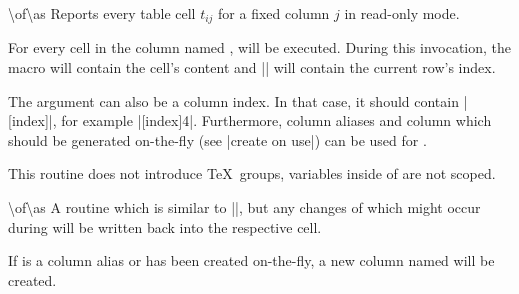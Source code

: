 \begin{command}{\pgfplotstableforeachcolumnelement{}\textbackslash of\textbackslash as}
	Reports every table cell $t_{ij}$ for a fixed column $j$ in read-only mode.

	For every cell in the column named ,  will be executed. During this invocation, the macro  will contain the cell's content and |\pgfplotstablerow| will contain the current row's index.
\begin{codeexample}[]
\begin{minipage}{0.8\linewidth}
\table
{}\of\table\as{}
\end{minipage}
\end{codeexample}
	The argument  can also be a column index. In that case, it should contain |[index]|, for example |[index]4|. Furthermore, column aliases and column which should be generated on-the-fly (see |create on use|) can be used for .

	This routine does not introduce \TeX\ groups, variables inside of  are not scoped.
\end{command}

\begin{command}{\pgfplotstablemodifyeachcolumnelement{}\textbackslash of\textbackslash as}
	A routine which is similar to |\pgfplotstableforeachcolumnelement|,
	but any changes of  which might occur during  will be written back into the respective cell.

\begin{codeexample}[]
\table
{}\of\table\as\cell{%
	\edef\cell{\#\pgfplotstablerow: \cell}%
}
\pgfplotstabletypeset[columns=error1,string type]{\table}
\end{codeexample}

	If  is a column alias or has been created on-the-fly, a new column named  will be created.
\end{command}

